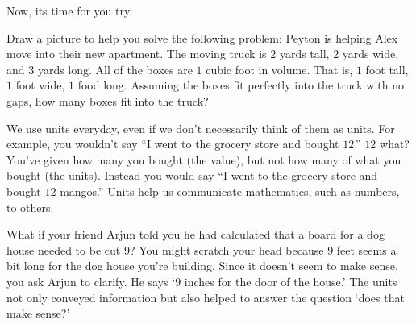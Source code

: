 \documentclass{ximera}
\begin{document}
Now, its time for you try.

\begin{exploration}
Draw a picture to help you solve the following problem: Peyton is helping Alex move into their new apartment. The moving truck is $2$ yards tall, $2$ yards wide, and $3$ yards long. All of the boxes are $1$ cubic foot in volume.  That is, $1$ foot tall, $1$ foot wide, $1$ food long. Assuming the boxes fit perfectly into the truck with no gaps, how many boxes fit into the truck?
\end{exploration}










We use units everyday, even if we don't necessarily think of them as units.  For example, you wouldn't say ``I went to the grocery store and bought $12$.''  $12$ what?  You've given how many you bought (the value), but not how many of what you bought (the units).  Instead you would say ``I went to the grocery store and bought $12$ mangos.'' Units help us communicate mathematics, such as numbers, to others.

What if your friend Arjun told you he had calculated that a board for a dog house needed to be cut $9$? You might scratch your head because $9$ feet seems a bit long for the dog house you're building. Since it doesn't seem to make sense, you ask Arjun to clarify. He says `$9$ inches for the door of the house.' The units not only conveyed information but also helped to answer the question `does that make sense?'
\end{document}
